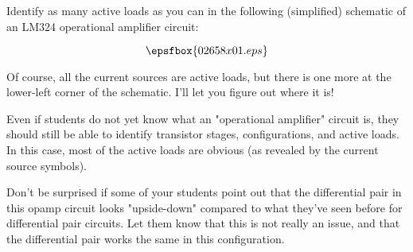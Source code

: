 

Identify as many active loads as you can in the following (simplified) schematic of an LM324 operational amplifier circuit:

$$\epsfbox{02658x01.eps}$$







Of course, all the current sources are active loads, but there is one more at the lower-left corner of the schematic.  I'll let you figure out where it is!







Even if students do not yet know what an "operational amplifier" circuit is, they should still be able to identify transistor stages, configurations, and active loads.  In this case, most of the active loads are obvious (as revealed by the current source symbols).

Don't be surprised if some of your students point out that the differential pair in this opamp circuit looks "upside-down" compared to what they've seen before for differential pair circuits.  Let them know that this is not really an issue, and that the differential pair works the same in this configuration.




